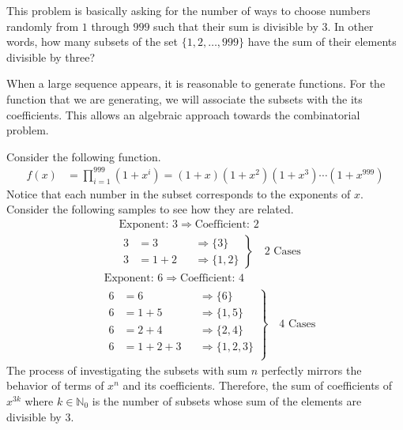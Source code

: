 \documentclass[../../../main.tex]{subfiles}
\begin{document}
\begin{solution}
This problem is basically asking for the number of ways to choose
numbers randomly from $1$ through $999$ such that their sum is
divisible by $3$. In other words, how many subsets of the set
$\{1, 2, \ldots, 999\}$ have the sum of their elements divisible by
three?

When a large sequence appears, it is reasonable to generate functions.
For the function that we are generating, we will associate the subsets
with the its coefficients. This allows an algebraic approach towards
the combinatorial problem.

Consider the following function.
\begin{align*}
    f(x)
    &= \prod_{i=1}^{999} \left( 1 + x^i \right)
    = (1 + x) \left( 1 + x^2 \right) \left( 1 + x^3 \right) \cdots
        \left( 1 + x^{999} \right)
\end{align*}
Notice that each number in the subset corresponds to the exponents of
$x$. Consider the following samples to see how they are related.
\begin{align*}
    &\text{Exponent: $3$} \Rightarrow \text{Coefficient: $2$} \\
    &\left.\begin{aligned}
        3 &= 3 &&\Rightarrow \{ 3 \} \\
        3 &= 1 + 2 &&\Rightarrow \{ 1, 2 \}
    \end{aligned}\right\}
    \quad \text{2 Cases}
\end{align*}
\begin{align*}
    &\text{Exponent: $6$} \Rightarrow \text{Coefficient: $4$} \\
    &\left.\begin{aligned}
        6 &= 6 &&\Rightarrow \{ 6 \} \\
        6 &= 1 + 5 &&\Rightarrow \{ 1, 5 \} \\
        6 &= 2 + 4 &&\Rightarrow \{ 2, 4 \} \\
        6 &= 1 + 2 + 3 &&\Rightarrow \{ 1, 2, 3 \} \\
    \end{aligned}\right\}
    \quad \text{4 Cases}
\end{align*}
The process of investigating the subsets with sum $n$ perfectly
mirrors the behavior of terms of $x^n$ and its coefficients.
Therefore, the sum of coefficients of $x^{3k}$ where
$k \in \mathbb{N}_0$ is the number of subsets whose sum of the
elements are divisible by $3$.


\end{solution}
\end{document}
